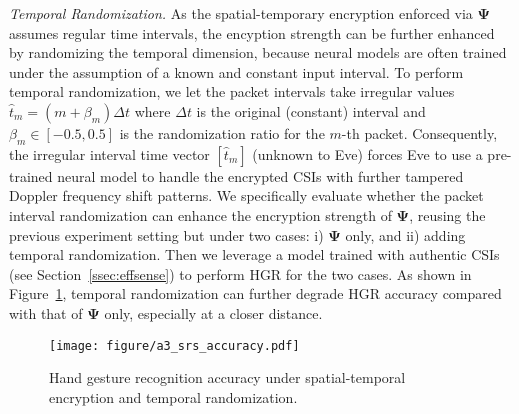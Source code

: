 \documentclass[conference,compsoc]{IEEEtran}
\newcommand{\rev}[1]{{\color{blue}#1}}      %
\newcommand{\newrev}[1]{{\color{blue}#1}}    %
\newcommand{\rev}[1]{#1}
\newcommand{\newrev}[1]{#1}
\begin{document}
\emph{\newrev{Temporal Randomization.}}
%
\newrev{As the spatial-temporary encryption enforced via $\bm{\Psi}$ assumes regular time intervals, the encyption strength can be further enhanced by randomizing the temporal dimension,} 
because neural models are often trained under the assumption of a known and constant input interval. To perform temporal \newrev{randomization}, we let the packet intervals take irregular values $ \hat{t}_m = (m +\beta_m)  \Delta t$ where $\Delta t $ is the original (constant) interval and $\beta_m \in \left[ -0.5, 0.5 \right] $ is the \newrev{randomization} ratio for the $m$-th packet. Consequently, the irregular interval time vector $[\hat{t}_m]$ (unknown to Eve) forces Eve to use a pre-trained neural model to handle the encrypted CSIs with further tampered Doppler frequency shift patterns.
We specifically evaluate whether the packet interval randomization can \newrev{enhance the encryption strength of $\bm{\Psi}$,
reusing} the previous experiment setting but under two cases: i) $\bm{\Psi}$ only, and ii) adding temporal randomization. Then we leverage a model trained with authentic CSIs (see Section~\ref{ssec:effsense}) to perform HGR for the two cases. As shown in Figure~\ref{sfig:sampling_scrambling},
\newrev{temporal} randomization can further degrade HGR accuracy compared with that of $\bm{\Psi}$ only, especially at a closer distance. 
%
\begin{figure}[t]
    \setlength\abovecaptionskip{8pt}
	\centering
	\texttt{[image: figure/a3\_srs\_accuracy.pdf]}
	\caption{Hand gesture recognition accuracy under 
 \rev{spatial-temporal encryption and temporal randomization}.} 
	\label{sfig:sampling_scrambling}
	\vspace{-1ex}
\end{figure}
\end{document}
